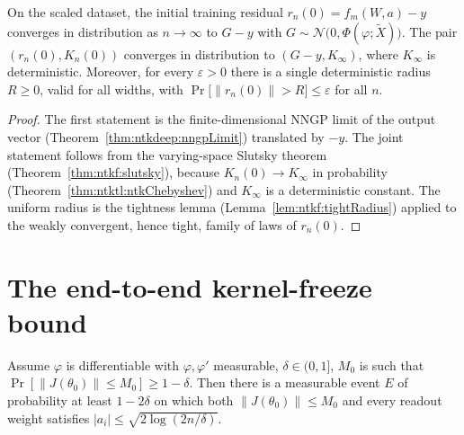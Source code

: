 \begin{theorem}\label{thm:ntktl:initialWeakLimit}
  \leanok
On the scaled dataset, the initial training residual $r_n(0)=f_m(W,a)-y$ converges in distribution as $n\to\infty$ to $G-y$ with $G\sim\mathcal N\bigl(0,\Phi(\varphi;\tilde X)\bigr)$. The pair $(r_n(0),K_n(0))$ converges in distribution to $(G-y,K_\infty)$, where $K_\infty$ is deterministic.
Moreover, for every $\varepsilon>0$ there is a single deterministic radius $R\ge0$, valid for all widths, with $\Pr\bigl[\|r_n(0)\|>R\bigr]\le\varepsilon$ for all $n$.
\end{theorem}

\begin{proof}
  \leanok
The first statement is the finite-dimensional NNGP limit of the output vector (Theorem~\ref{thm:ntkdeep:nngpLimit}) translated by $-y$. The joint statement follows from the varying-space Slutsky theorem (Theorem~\ref{thm:ntkf:slutsky}), because
$K_n(0)\to K_\infty$ in probability (Theorem~\ref{thm:ntktl:ntkChebyshev}) and $K_\infty$ is a deterministic constant. The uniform radius is the tightness lemma (Lemma~\ref{lem:ntkf:tightRadius}) applied to the weakly convergent, hence tight, family of laws of $r_n(0)$.
\end{proof}


\section{The end-to-end kernel-freeze bound}\label{sec:ntktl:kernelFreeze}

\begin{lemma}\label{lem:ntktl:goodEvent}
  \leanok
Assume $\varphi$ is differentiable with $\varphi,\varphi'$ measurable, $\delta\in(0,1]$, $M_0$ is such that $\Pr[\|J(\theta_0)\|\le M_0]\ge1-\delta$. Then there is a measurable event $E$ of probability at least $1-2\delta$ on which both
$\|J(\theta_0)\|\le M_0$ and every readout weight satisfies $|a_i|\le\sqrt{2\log(2n/\delta)}$.
\end{lemma}

